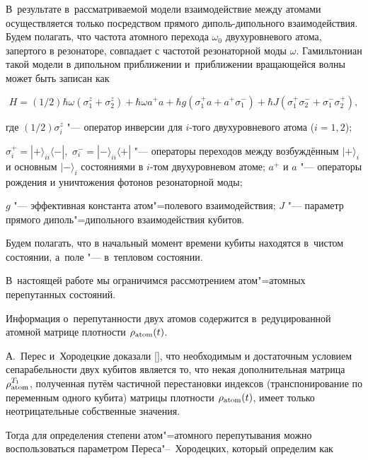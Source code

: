 В~результате в~рассматриваемой модели взаимодействие между атомами осуществляется только посредством прямого диполь-дипольного взаимодействия.  Будем полагать, что частота атомного перехода $\omega _{0} $ двухуровневого атома, запертого в резонаторе, совпадает с  частотой резонаторной моды $\omega $. Гамильтониан  такой модели в дипольном приближении и~приближении вращающейся волны может быть записан как

\begin{equation}

H=(1/2)\hbar \omega (\sigma _{1}^{z} +\sigma _{2}^{z} )+\hbar \omega a^{+} a + \hbar g(\sigma _{1}^{+} a+a^{+} \sigma _{1}^{-} )+\hbar J(\sigma _{1}^{+} \sigma _{2}^{-} +\sigma_{1}^{-} \sigma _{2}^{+} ),

\label{bash:(1)}

\end{equation}

где $(1/2)\sigma _{i}^{z} $ "--- оператор инверсии для $i$-того двухуровневого атома ($i =1, 2$); 

\mbox{$\sigma _{i}^{+} =|+\rangle _{ii} \langle -|,$} $ \sigma _{i}^{-} =|-\rangle _{ii} \langle +|$ "--- операторы переходов между возбуждённым  $|+\rangle _{i} $ и основным $|-\rangle _{i} $ состояниями в $i$-том  двухуровневом атоме; $a^{+} $ и $a$ "--- операторы рождения и уничтожения фотонов резонаторной моды; 

 $g$ "--- эффективная константа атом"=полевого взаимодействия;  $J$ "--- параметр прямого диполь"=дипольного взаимодействия кубитов.



Будем полагать, что в начальный момент времени кубиты находятся в~чистом  состоянии, а~поле "--- в~тепловом состоянии.

В~настоящей работе мы ограничимся рассмотрением атом"=атомных перепутанных состояний. 

Информация о~перепутанности двух атомов содержится в~редуцированной атомной матрице плотности $\rho _{\rm atom} (t)$. 

А.~Перес и~Хородецкие   доказали [], что необходимым и достаточным условием сепарабельности двух кубитов является то, что некая дополнительная матрица $\rho _{\rm atom}^{T_{1} } $, полученная путём частичной перестановки индексов (транспонирование по переменным одного кубита) матрицы плотности $\rho _{\rm atom} (t)$, имеет только неотрицательные собственные значения.  

Тогда для определения степени атом"=атомного перепутывания можно воспользоваться параметром Переса"--~Хородецких,  который определим как

